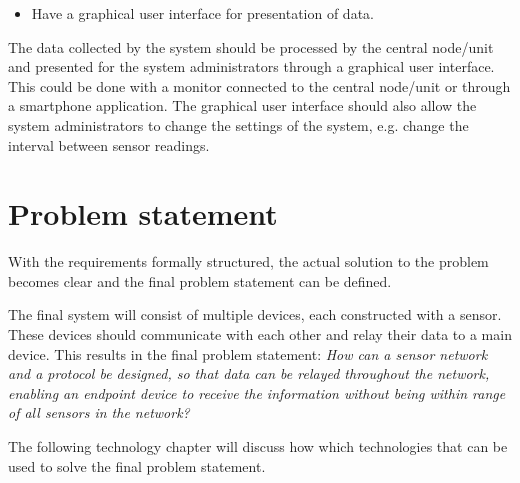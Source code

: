 \begin{itemize}
\item Have a graphical user interface for presentation of data.
\end{itemize}
The data collected by the system should be processed by the central node/unit and presented for the system administrators through a graphical user interface. This could be done with a monitor connected to the central node/unit or through a smartphone application. The graphical user interface should also allow the system administrators to change the settings of the system, e.g. change the interval between sensor readings.
\pagebreak

\section{Problem statement}
With the requirements formally structured, the actual solution to the problem becomes clear and the final problem statement can be defined.

The final system will consist of multiple devices, each constructed with a sensor. These devices should communicate with each other and relay their data to a main device. This results in the final problem statement:
\textit{How can a sensor network and a protocol be designed, so that data can be relayed throughout the network, enabling an endpoint device to receive the information without being within range of all sensors in the network?}

The following technology chapter will discuss how which technologies that can be used to solve the final problem statement.







